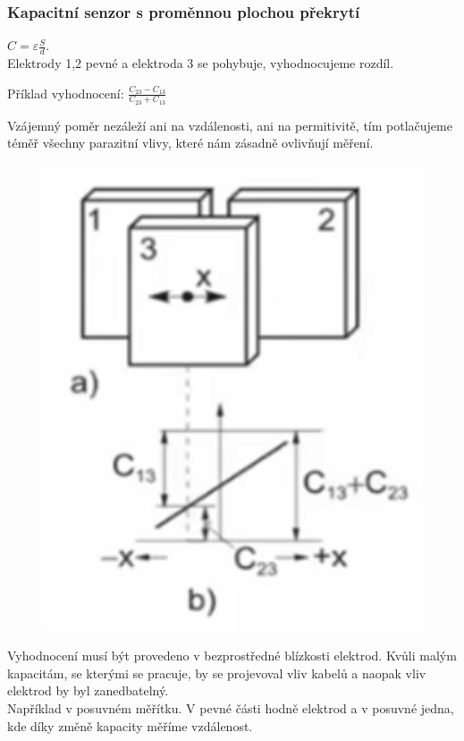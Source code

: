 \subsubsection{Kapacitní senzor s proměnnou plochou překrytí}
\(C = \varepsilon \frac{S}{d}\).\\
Elektrody 1,2 pevné a elektroda 3 se pohybuje, vyhodnocujeme rozdíl.
\begin{center}
    Příklad vyhodnocení: \(\frac{C_{23}-C_{13}}{C_{23}+C_{13}}\)
\end{center}
Vzájemný poměr nezáleží ani na vzdálenosti, ani na permitivitě, tím potlačujeme téměř všechny parazitní vlivy, které nám zásadně ovlivňují měření.\\
\begin{figure}[h!]
    \centering
    \includegraphics[scale = 0.07]{img/KapPromPloch.png}
\end{figure}

Vyhodnocení musí být provedeno v bezprostředné blízkosti elektrod. Kvůli malým kapacitám, se kterými se pracuje, by se projevoval vliv kabelů a naopak vliv elektrod by byl zanedbatelný.\\
Například v posuvném měřítku. V pevné části hodně elektrod a v posuvné jedna, kde díky změně kapacity měříme vzdálenost.\\

